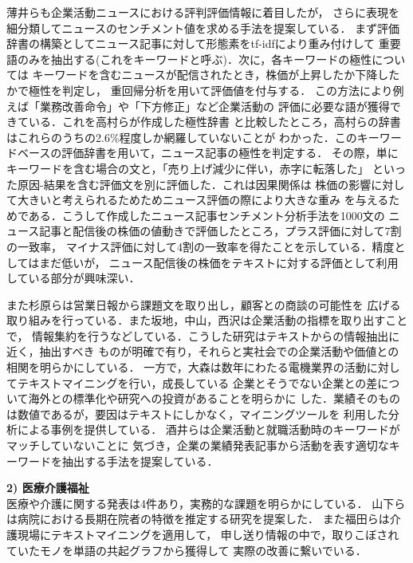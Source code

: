 \documentclass[twocolumn]{jarticle}
\begin{document}
薄井ら\cite{usui2014}も企業活動ニュースにおける評判評価情報に着目したが，
さらに表現を細分類してニュースのセンチメント値を求める手法を提案している．
まず評価辞書の構築としてニュース記事に対して形態素をtf-idfにより重み付けして
重要語のみを抽出する(これをキーワードと呼ぶ)．次に，各キーワードの極性については
キーワードを含むニュースが配信されたとき，株価が上昇したか下降したかで極性を判定し，
重回帰分析を用いて評価値を付与する．
この方法により例えば「業務改善命令」や「下方修正」など企業活動の
評価に必要な語が獲得できている．これを高村らが作成した極性辞書\cite{takamura05}
と比較したところ，高村らの辞書はこれらのうちの2.6\%程度しか網羅していないことが
わかった．このキーワードベースの評価辞書を用いて，ニュース記事の極性を判定する．
その際，単にキーワードを含む場合の文と，「売り上げ減少に伴い，赤字に転落した」
といった原因-結果を含む評価文を別に評価した．これは因果関係は
株価の影響に対して大きいと考えられるためためニュース評価の際により大きな重み
を与えるためである．こうして作成したニュース記事センチメント分析手法を1000文の
ニュース記事と配信後の株価の値動きで評価したところ，プラス評価に対して7割の一致率，
マイナス評価に対して4割の一致率を得たことを示している．精度としてはまだ低いが，
ニュース配信後の株価をテキストに対する評価として利用している部分が興味深い．

また杉原らは営業日報から課題文を取り出し，顧客との商談の可能性を
広げる取り組みを行っている．また坂地，中山，西沢は企業活動の指標を取り出すことで，
情報集約を行うなどしている．こうした研究はテキストからの情報抽出に近く，抽出すべき
ものが明確で有り，それらと実社会での企業活動や価値との相関を明らかにしている．
一方で，大森は数年にわたる電機業界の活動に対してテキストマイニングを行い，成長している
企業とそうでない企業との差について海外との標準化や研究への投資があることを明らかに
した．業績そのものは数値であるが，要因はテキストにしかなく，マイニングツールを
利用した分析による事例を提供している．
酒井\cite{sakai2014}らは企業活動と就職活動時のキーワードがマッチしていないことに
気づき，企業の業績発表記事から活動を表す適切なキーワードを抽出する手法を提案している．


{\bf 2) 医療介護福祉}\\
医療や介護に関する発表は4件あり，実務的な課題を明らかにしている．
山下らは病院における長期在院者の特徴を推定する研究を提案した．
また福田らは介護現場にテキストマイニングを適用して，
申し送り情報の中で，取りこぼされていたモノを単語の共起グラフから獲得して
実際の改善に繋いでいる．
\end{document}
